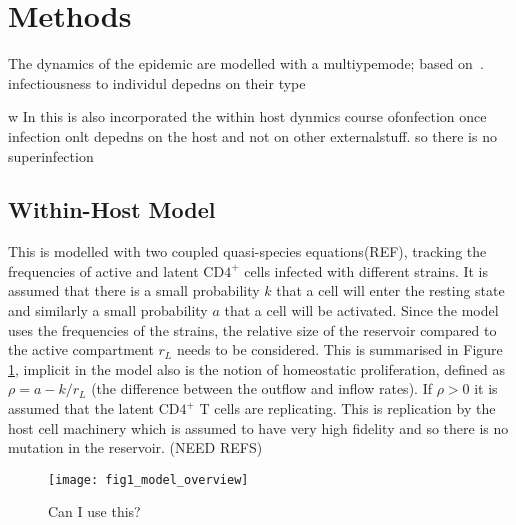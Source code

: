 \documentclass[DIV=15]{scrartcl}
\begin{document}
\section{Methods}
The dynamics of the epidemic are modelled with  a multiypemode; based on~\cite{diekmann2013}. infectiousness to  individul depedns on their type 
 
 w In this is also  incorporated the within host dynmics
 course ofonfection once infection onlt  depedns on the host and not on other externalstuff. so there is no superinfection

\subsection{Within-Host Model}


This  is modelled with two coupled quasi-species equations(REF), tracking the frequencies of active and latent CD$4^+$ cells infected with different strains. It is assumed that there is a small probability $k$ that  a cell will enter the resting state and similarly a small probability $a$  that a cell will  be activated. Since the model uses the frequencies of the strains, the relative size of the reservoir compared to the active compartment $r_L$ needs to be considered. This is summarised in Figure \ref{Within Host Diagram}, implicit in the model also is  the notion of homeostatic proliferation, defined as $\rho = a - k/r_L$ (the difference between the outflow and inflow rates). If $\rho>0$
 it is assumed that
the latent CD$4^+$ T cells  are replicating. This is replication by the host cell machinery which is assumed  to have very high fidelity and so there is no mutation in the reservoir. (NEED REFS)
\begin{figure}[h]
 \begin{center}
 \texttt{[image: fig1\_model\_overview]}
 \end{center}
 \caption{Can I use this?}
 \label{Within Host Diagram}
 \end{figure}
 
\end{document}
